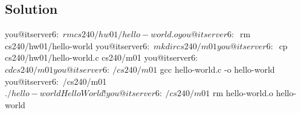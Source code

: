 
\subsection*{Solution}

\begin{terminal}
you@itserver6:~$ rm cs240/hw01/hello-world.o
you@itserver6:~$ rm cs240/hw01/hello-world
you@itserver6:~$ mkdir cs240/m01
you@itserver6:~$ cp cs240/hw01/hello-world.c cs240/m01
you@itserver6:~$ cd cs240/m01
you@itserver6:~/cs240/m01$ gcc hello-world.c -o hello-world
you@itserver6:~/cs240/m01$ ./hello-world
Hello World!
you@itserver6:~/cs240/m01$ rm hello-world.o hello-world
\end{terminal}
